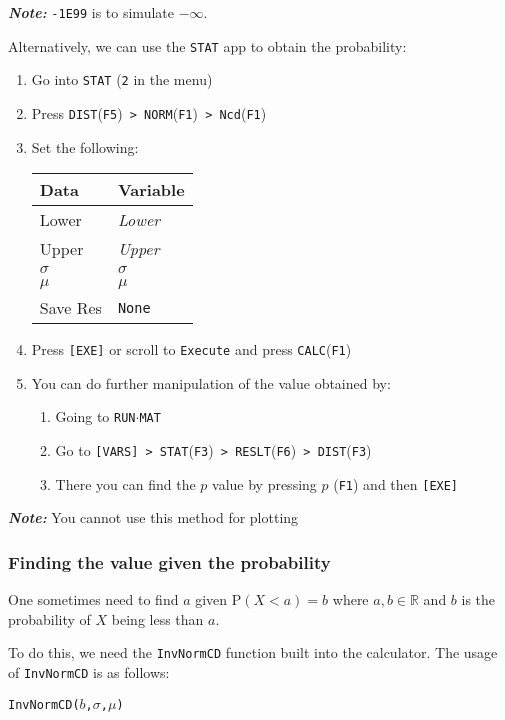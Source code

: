 \documentclass[a5paper,draft]{memoir}
\def\code#1{\texttt{#1}}
\def\note#1{\textbf{\textit{Note:}} #1}
\newcommand{\addtoindex}[1]{#1\index{#1}}
\begin{document}
\note{\code{-1E99} is to simulate $-\infty$.}

Alternatively, we can use the \code{STAT} app to obtain the probability:
\begin{enumerate}
	\item Go into \code{STAT} (\code{2} in the menu)
	\item Press \code{DIST}(\code{F5})\code{ > NORM}(\code{F1})\code{ > Ncd}(\code{F1})
	\item Set the following:
	\begin{center}
		\setlength{\tabcolsep}{10pt}
		\renewcommand{\arraystretch}{1.2}
		\begin{tabular}{|l|l|}
			\hline
			Data		& Variable \\
			\hline
			Lower		& \textit{Lower} \\
			\hline
			Upper		& \textit{Upper} \\
			\hline
			$\sigma$	& $\sigma$ \\
			\hline
			$\mu$		& $\mu$ \\
			\hline
			Save Res	& \code{None} \\
			\hline
		\end{tabular}
	\end{center}
	\item Press \code{[EXE]} or scroll to \code{Execute} and press \code{CALC}(\code{F1})
	\item You can do further manipulation of the value obtained by:
	\begin{enumerate}
		\item Going to \code{RUN$\cdot$MAT}
		\item Go to \code{[VARS] > STAT}(\code{F3})\code{ > RESLT}(\code{F6})\code{ > DIST}(\code{F3})
		\item There you can find the $p$ value by pressing $p$ (\code{F1}) and then \code{[EXE]}
	\end{enumerate} 
\end{enumerate}
\note{You cannot use this method for plotting}

\subsubsection{Finding the value given the probability}
One sometimes need to find $a$ given $\textrm{P}(X < a) = b$ where $a,b \in \mathbb{R}$ and $b$ is the probability of $X$ being less than $a$. 

To do this, we need the \code{\addtoindex{InvNormCD}} function built into the calculator. The usage of \code{InvNormCD} is as follows:
\begin{center}
	\code{InvNormCD($b$,$\sigma$,$\mu$)}
\end{center}
\end{document}
